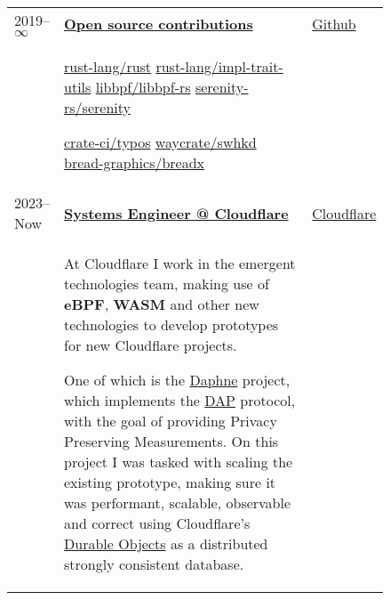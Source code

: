 \documentclass{article}
\newcommand{\ul}[1]{\underline{#1}}
\begin{document}
\begin{tabular}{p{0.11\linewidth}p{0.73\linewidth}l}

    2019--$\infty$ & \ul{\textbf{Open source contributions}} & \href{https://github.com}{Github} \\
    &
        \href{https://github.com/rust-lang/rust/pulls?q=author\%3Amendess+}
            {rust-lang/rust}
        \hspace{2em}
        \href{https://github.com/rust-lang/impl-trait-utils/pulls?q=author\%3Amendess+}
            {rust-lang/impl-trait-utils}
        \hspace{2em}
        \href{https://github.com/libbpf/libbpf-rs/pulls?q=author\%3Amendess+}
            {libbpf/libbpf-rs}
        \hspace{2em}
        \href{https://github.com/serenity-rs/serenity/pulls?q=author\%3Amendess+}
            {serenity-rs/serenity}



        \href{https://github.com/crate-ci/typos/pulls?q=author\%3Amendess+}
            {crate-ci/typos}
        \hspace{2em}
        \href{https://github.com/waycrate/swhkd/pulls?q=author\%3Amendess+}
            {waycrate/swhkd}
        \hspace{5em}
        \href{https://github.com/bread-graphics/breadx/pulls?q=author\%3Amendess+}
            {bread-graphics/breadx}
    & \\

    2023--Now & \ul{\textbf{Systems Engineer @ Cloudflare}} & \href{https://cloudflare.com}{Cloudflare} \\
    &
        At Cloudflare I work in the emergent technologies team, making use
        of \textbf{eBPF}, \textbf{WASM} and other new technologies to develop prototypes for new
        Cloudflare projects.

        One of which is the \href{https://github.com/cloudflare/daphne}{Daphne}
        project, which implements the
        \href{https://datatracker.ietf.org/doc/draft-ietf-ppm-dap/}{DAP}
        protocol, with the goal of providing Privacy Preserving Measurements. On
        this project I was tasked with scaling the existing prototype, making
        sure it was performant, scalable, observable and correct using Cloudflare's
        \href{https://developers.cloudflare.com/durable-objects/}{Durable Objects}
        as a distributed strongly consistent database.
    & \\


\end{tabular}
\end{document}
